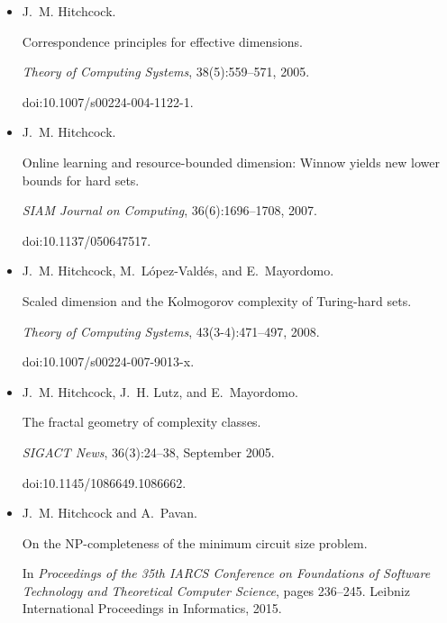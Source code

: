 \begin{itemize}
\item[] 
[30]

J. M. Hitchcock.


Correspondence principles for effective dimensions.


\emph{Theory of Computing Systems}, 38(5):559–571, 2005.


doi:10.1007/s00224-004-1122-1.





\item[] 
[31]

J. M. Hitchcock.


Online learning and resource-bounded dimension: Winnow yields new
lower bounds for hard sets.


\emph{SIAM Journal on Computing}, 36(6):1696–1708, 2007.


doi:10.1137/050647517.





\item[] 
[32]

J. M. Hitchcock, M. López-Valdés, and E. Mayordomo.


Scaled dimension and the Kolmogorov complexity of Turing-hard
sets.


\emph{Theory of Computing Systems}, 43(3-4):471–497, 2008.


doi:10.1007/s00224-007-9013-x.





\item[] 
[33]

J. M. Hitchcock, J. H. Lutz, and E. Mayordomo.


The fractal geometry of complexity classes.


\emph{SIGACT News}, 36(3):24–38, September 2005.


doi:10.1145/1086649.1086662.





\item[] 
[34]

J. M. Hitchcock and A. Pavan.


On the NP-completeness of the minimum circuit size problem.


In \emph{Proceedings of the 35th IARCS Conference on Foundations of
Software Technology and Theoretical Computer Science}, pages 236–245.
Leibniz International Proceedings in Informatics, 2015.



\end{itemize}
